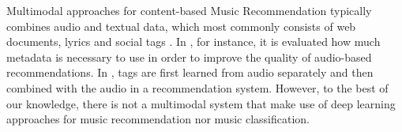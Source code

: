 

Multimodal approaches for content-based Music Recommendation typically combines audio and textual data, which most commonly consists of web documents, lyrics and social tags \citep{liem2011need}. In \citep{Bogdanov2011}, for instance, it is evaluated how much metadata is necessary to use in order to improve the quality of audio-based recommendations. In \citep{Eck:NIPS2007}, tags are first learned from audio separately and then combined with the audio in a recommendation system. 
However, to the best of our knowledge, there is not a multimodal system that make use of deep learning approaches for music recommendation nor music classification.

